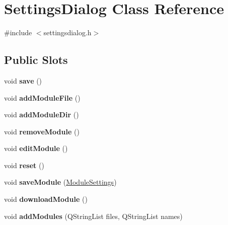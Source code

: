 \hypertarget{classSettingsDialog}{
\section{SettingsDialog Class Reference}
\label{classSettingsDialog}
}


{\ttfamily \#include $<$settingsdialog.h$>$}

\subsection*{Public Slots}
\begin{DoxyCompactItemize}
\item 
\hypertarget{classSettingsDialog_adea5c3242cbad78dfc8d9948d2a265de}{
void {\bfseries save} ()}
\label{classSettingsDialog_adea5c3242cbad78dfc8d9948d2a265de}

\item 
\hypertarget{classSettingsDialog_a081503f4834e7a8ce54ac2d01f9b61b2}{
void {\bfseries addModuleFile} ()}
\label{classSettingsDialog_a081503f4834e7a8ce54ac2d01f9b61b2}

\item 
\hypertarget{classSettingsDialog_a5416feca0f8183ab304c5c484a2e69b1}{
void {\bfseries addModuleDir} ()}
\label{classSettingsDialog_a5416feca0f8183ab304c5c484a2e69b1}

\item 
\hypertarget{classSettingsDialog_ae27991e987832e86da7dc05621a9e400}{
void {\bfseries removeModule} ()}
\label{classSettingsDialog_ae27991e987832e86da7dc05621a9e400}

\item 
\hypertarget{classSettingsDialog_a76fa3919cf0f15111e375833ece48517}{
void {\bfseries editModule} ()}
\label{classSettingsDialog_a76fa3919cf0f15111e375833ece48517}

\item 
\hypertarget{classSettingsDialog_a51de698192c7c809e92221fcbffaf642}{
void {\bfseries reset} ()}
\label{classSettingsDialog_a51de698192c7c809e92221fcbffaf642}

\item 
\hypertarget{classSettingsDialog_a81e0592cf638ac19d0a91f08c3b98df6}{
void {\bfseries saveModule} (\hyperlink{classModuleSettings}{ModuleSettings})}
\label{classSettingsDialog_a81e0592cf638ac19d0a91f08c3b98df6}

\item 
\hypertarget{classSettingsDialog_a14cc2b79fda96032f2e1ca626b6e3efc}{
void {\bfseries downloadModule} ()}
\label{classSettingsDialog_a14cc2b79fda96032f2e1ca626b6e3efc}

\item 
\hypertarget{classSettingsDialog_a2b94d87ae080b290631d3379b9e9bf58}{
void {\bfseries addModules} (QStringList files, QStringList names)}
\label{classSettingsDialog_a2b94d87ae080b290631d3379b9e9bf58}

\end{DoxyCompactItemize}
